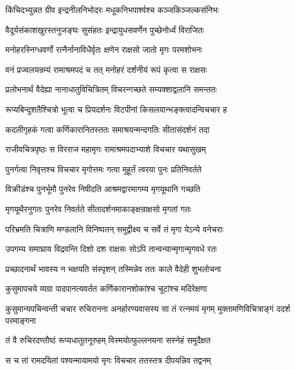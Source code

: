 \twolineshloka
{किंचिदभ्युन्नत ग्रीव इन्द्रनीलनिभोदरः}
{मधूकनिभपार्श्वश्च कञ्जकिञ्जल्कसंनिभः} %

\twolineshloka
{वैदूर्यसंकाशखुरस्तनुजङ्घः सुसंहतः}
{इन्द्रायुधसवर्णेन पुच्छेनोर्ध्वं विराजितः} %

\twolineshloka
{मनोहरस्निग्धवर्णो रत्नैर्नानाविधैर्वृतः}
{क्षणेन राक्षसो जातो मृगः परमशोभनः} %

\twolineshloka
{वनं प्रज्वलयन्रम्यं रामाश्रमपदं च तत्}
{मनोहरं दर्शनीयं रूपं कृत्वा स राक्षसः} %

\twolineshloka
{प्रलोभनार्थं वैदेह्या नानाधातुविचित्रितम्}
{विचरन्गच्छते सम्यक्शाद्वलानि समन्ततः} %

\twolineshloka
{रूप्यबिन्दुशतैश्चित्रो भूत्वा च प्रियदर्शनः}
{विटपीनां किसलयान्भङ्क्त्वादन्विचचार ह} %

\twolineshloka
{कदलीगृहकं गत्वा कर्णिकारानितस्ततः}
{समाश्रयन्मन्दगतिः सीतासंदर्शनं तदा} %

\twolineshloka
{राजीवचित्रपृष्ठः स विरराज महामृगः}
{रामाश्रमपदाभ्याशे विचचार यथासुखम्} %

\twolineshloka
{पुनर्गत्वा निवृत्तश्च विचचार मृगोत्तमः}
{गत्वा मुहूर्तं त्वरया पुनः प्रतिनिवर्तते} %

\twolineshloka
{विक्रीडंश्च पुनर्भूमौ पुनरेव निषीदति}
{आश्रमद्वारमागम्य मृगयूथानि गच्छति} %

\twolineshloka
{मृगयूथैरनुगतः पुनरेव निवर्तते}
{सीतादर्शनमाकाङ्क्षन्राक्षसो मृगतां गतः} %

\twolineshloka
{परिभ्रमति चित्राणि मण्डलानि विनिष्पतन्}
{समुद्वीक्ष्य च सर्वे तं मृगा येऽन्ये वनेचराः} %

\twolineshloka
{उपगम्य समाघ्राय विद्रवन्ति दिशो दश}
{राक्षसः सोऽपि तान्वन्यान्मृगान्मृगवधे रतः} %

\twolineshloka
{प्रच्छादनार्थं भावस्य न भक्षयति संस्पृशन्}
{तस्मिन्नेव ततः काले वैदेही शुभलोचना} %

\twolineshloka
{कुसुमापचये व्यग्रा पादपानत्यवर्तत}
{कर्णिकारानशोकांश्च चूटांश्च मदिरेक्षणा} %

\threelineshloka
{कुसुमान्यपचिन्वन्ती चचार रुचिरानना}
{अनर्हारण्यवासस्य सा तं रत्नमयं मृगम्}
{मुक्तामणिविचित्राङ्गं ददर्श परमाङ्गना} %

\twolineshloka
{तं वै रुचिरदण्तौष्ठं रूप्यधातुतनूरुहम्}
{विस्मयोत्फुल्लनयना सस्नेहं समुदैक्षत} %

\twolineshloka
{स च तां रामदयितां पश्यन्मायामयो मृगः}
{विचचार ततस्तत्र दीपयन्निव तद्वनम्} %

